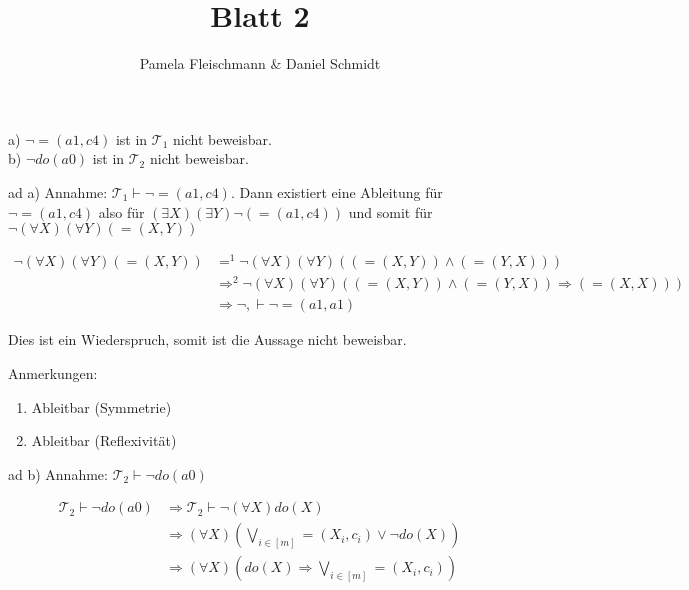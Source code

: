 \documentclass[12pt,a4paper]{amsart}
\begin{document}
\title{Blatt 2}

\author{Pamela Fleischmann \& Daniel Schmidt}

\maketitle

\begin{aufgabe1}
a) $\lnot =(a1,c4)$ ist in $\mathcal{T}_1$ nicht beweisbar.\\
b) $\lnot do(a0)$ ist in $\mathcal{T}_2$ nicht beweisbar.
\end{aufgabe1}

\medskip

ad a) Annahme: $\mathcal{T}_1 \vdash \lnot = (a1, c4)$. Dann existiert eine Ableitung für $\lnot = (a1, c4)$ also für $(\exists X)(\exists Y) \lnot(= (a1, c4))$ und somit für $\lnot (\forall X) (\forall Y)(= (X, Y))$

\begin{equation}
\begin{split}
\lnot (\forall X) (\forall Y)(= (X, Y)) &=^1 \lnot (\forall X) (\forall Y)((= (X, Y)) \wedge (= (Y, X)))\\
&\Rightarrow^2 \lnot (\forall X) (\forall Y) ((= (X, Y)) \wedge (= (Y, X)) \Rightarrow (= (X, X)))\\
&\Rightarrow \lnot, \vdash \lnot = (a1, a1)
\end{split}
\end{equation}

Dies ist ein Wiederspruch, somit ist die Aussage nicht beweisbar.

Anmerkungen:
\begin{enumerate}
\item Ableitbar (Symmetrie)
\item Ableitbar (Reflexivität)
\end{enumerate}

\medskip

ad b) Annahme: $\mathcal{T}_2 \vdash \lnot do(a0)$

\begin{equation}
\begin{split}
\mathcal{T}_2 \vdash \lnot do(a0) &\Rightarrow \mathcal{T}_2 \vdash \lnot (\forall X) do(X)\\
&\Rightarrow (\forall X) (\bigvee_{i \in [m]} = (X_i, c_i) \vee \lnot do(X))\\
&\Rightarrow (\forall X) (do(X) \Rightarrow \bigvee_{i \in [m]} = (X_i, c_i))
\end{split}
\end{equation}
\end{document}
